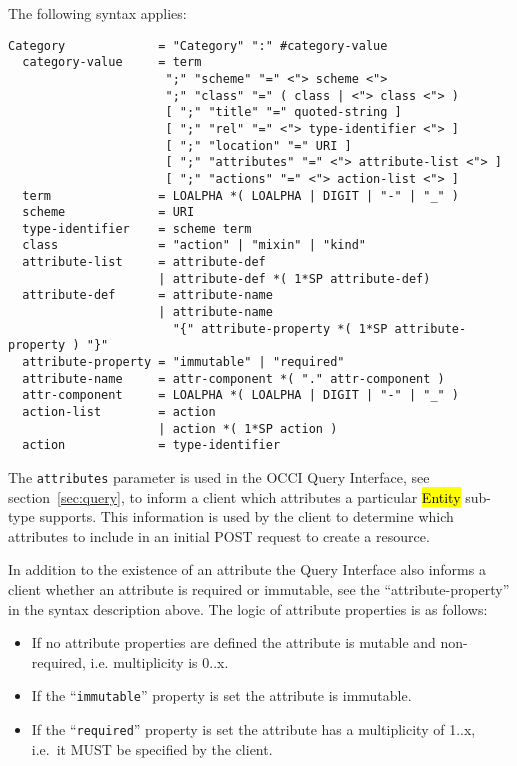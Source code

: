 \documentclass[10pt,a4paper]{article}
\begin{document}
The following syntax applies:

\begin{verbatim}
Category             = "Category" ":" #category-value
  category-value     = term
                      ";" "scheme" "=" <"> scheme <">
                      ";" "class" "=" ( class | <"> class <"> )
                      [ ";" "title" "=" quoted-string ]
                      [ ";" "rel" "=" <"> type-identifier <"> ]
                      [ ";" "location" "=" URI ]
                      [ ";" "attributes" "=" <"> attribute-list <"> ]
                      [ ";" "actions" "=" <"> action-list <"> ]
  term               = LOALPHA *( LOALPHA | DIGIT | "-" | "_" )
  scheme             = URI
  type-identifier    = scheme term
  class              = "action" | "mixin" | "kind"
  attribute-list     = attribute-def
                     | attribute-def *( 1*SP attribute-def)
  attribute-def      = attribute-name
                     | attribute-name
                       "{" attribute-property *( 1*SP attribute-property ) "}"
  attribute-property = "immutable" | "required"
  attribute-name     = attr-component *( "." attr-component )
  attr-component     = LOALPHA *( LOALPHA | DIGIT | "-" | "_" )
  action-list        = action
                     | action *( 1*SP action )
  action             = type-identifier
\end{verbatim}

The {\tt attributes} parameter is used in the OCCI Query Interface,
see section~\ref{sec:query}, to inform a client which attributes a
particular \hl{Entity} sub-type supports. This information is used by
the client to determine which attributes to include in an initial POST
request to create a resource.

In addition to the existence of an attribute the Query Interface also
informs a client whether an attribute is required or immutable, see
the ``attribute-property'' in the syntax description above. The logic
of attribute properties is as follows:

\begin{itemize} 
  \item If no attribute properties are defined the attribute is
    mutable and non-required, i.e. multiplicity is 0..x.
  \item If the ``{\tt immutable}'' property is set the attribute is
    immutable.
  \item If the ``{\tt required}'' property is set the attribute has a
    multiplicity of 1..x, i.e.~it MUST be specified by the client.
\end{itemize}
\end{document}
